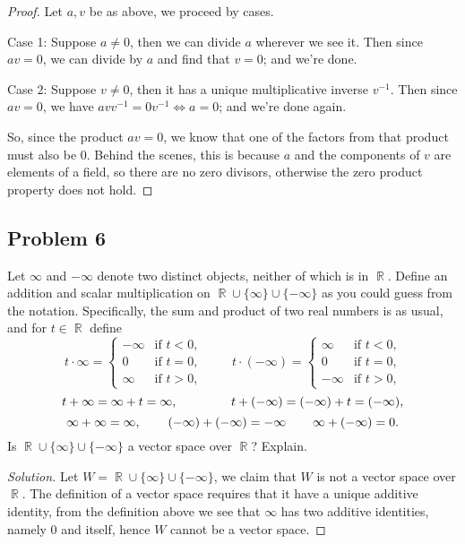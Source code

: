 \documentclass[letterpaper, 12pt]{amsart}
\DeclareMathOperator{\R}{\mathbb{R}}
\theoremstyle{definition}  %
\begin{document}
		\begin{proof}
		Let $a,v$ be as above, we proceed by cases.
		
		Case 1: Suppose $a \neq 0$, then we can divide $a$ wherever we see it.
		Then since $av = 0$, we can divide by $a$ and find that $v = 0$; and we're done.

		Case 2: Suppose $v \neq 0$, then it has a unique multiplicative inverse $v^{-1}$.
		Then since $av = 0$, we have $avv^{-1} = 0v^{-1} \iff a = 0$; and we're done again.

		So, since the product $av = 0$, we know that one of the factors from that product must also be 0.
		Behind the scenes, this is because $a$ and the components of $v$ are elements of a field, so there are no zero divisors, otherwise the zero product property does not hold.
		\end{proof}

		\subsection*{Problem 6}
		Let $\infty$ and $-\infty$ denote two distinct objects, neither of which is in $\R$.
		Define an addition and scalar multiplication on $\R \cup \{\infty\} \cup \{-\infty\}$ as you could guess from the notation.
		Specifically, the sum and product of two real numbers is as usual, and for $t \in \R$ define \[ t \cdot \infty = \begin{cases} -\infty & \text{if $t < 0$,} \\ 0 & \text{if $t = 0$,} \\ \infty & \text{if $t > 0$,} \end{cases} \hspace{1cm} t \cdot (-\infty) = \begin{cases} \infty & \text{if $t < 0$,} \\ 0 & \text{if $t = 0$,} \\ -\infty & \text{if $t > 0$,} \end{cases} \]
		\[ t + \infty = \infty + t = \infty, \hspace{1.5cm} t + (-\infty) = (-\infty) + t = (-\infty), \]
		\[ \infty + \infty = \infty, \hspace{.75cm} (-\infty) + (-\infty) = -\infty \hspace{.75cm} \infty + (-\infty) = 0. \]
		Is $\R \cup \{\infty\} \cup \{-\infty\}$ a vector space over $\R$?
		Explain.

		\begin{proof}[Solution]
		Let $W = \R \cup \{ \infty \} \cup \{ -\infty \}$, we claim that $W$ is not a vector space over $\R$.
		The definition of a vector space requires that it have a unique additive identity, from the definition above we see that $\infty$ has two additive identities, namely 0 and itself, hence $W$ cannot be a vector space.
		\end{proof}
\end{document}

